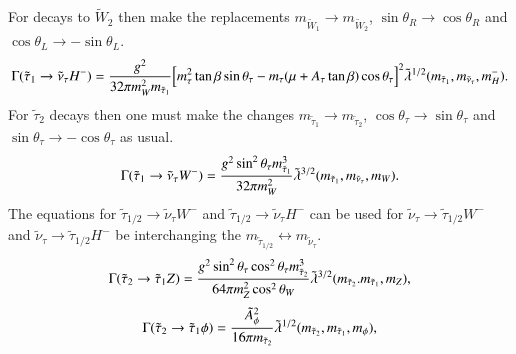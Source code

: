 \documentclass[final,3p,times,pdflatex]{elsarticle}
\begin{document}
For decays to $\tilde{W}_2$ then make the replacements $m_{\tilde{W}_1} \rightarrow m_{\tilde{W}_2}$, $\sin\theta_R \rightarrow \cos\theta_R$ and $\cos\theta_L \rightarrow -\sin\theta_L$.
\begin{equation}\label{stau1nutauHpm}
\begin{aligned}
\Gamma (\tilde{\tau}_1 \rightarrow \tilde{\nu}_\tau H^-) = {g^2 \over 32\pi m_W^2 m_{\tilde{\tau}_1}} \Big[m_\tau^2 \tan\beta\sin\theta_{\tau} - m_\tau (\mu + A_\tau \tan\beta) \cos\theta_{\tau}\Big]^2 \tilde{\lambda}^{1/2} (m_{\tilde{\tau}_1}, m_{\tilde{\nu}_\tau}, m_H^-).
\end{aligned}
\end{equation} 
For $\tilde{\tau}_2$ decays then one must make the changes $m_{\tilde{\tau}_1} \rightarrow m_{\tilde{\tau}_2}$, $\cos\theta_\tau \rightarrow \sin\theta_\tau$ and $\sin\theta_\tau \rightarrow -\cos\theta_\tau$ as usual.
\begin{equation}\label{stau1nutauW}
\begin{aligned}
\Gamma (\tilde{\tau}_1 \rightarrow \tilde{\nu}_\tau W^-) = {g^2 \sin^2\theta_\tau m_{\tilde{\tau}_1}^3 \over 32\pi m_W^2 } \tilde{\lambda}^{3/2} (m_{\tilde{\tau}_1}, m_{\tilde{\nu}_\tau}, m_W).
\end{aligned}
\end{equation} 
The equations for $\tilde{\tau}_{1/2} \rightarrow \tilde{\nu}_\tau W^-$ and $\tilde{\tau}_{1/2} \rightarrow \tilde{\nu}_\tau H^-$ can be used for $\tilde{\nu}_{\tau} \rightarrow \tilde{\tau}_{1/2} W^-$ and $\tilde{\nu}_{\tau} \rightarrow \tilde{\tau}_{1/2} H^-$ be interchanging the $m_{\tilde{\tau}_{1/2}} \leftrightarrow m_{\tilde{\nu}_{\tau}}$.
\begin{equation}\label{stau2stau1Z}
\begin{aligned}
\Gamma (\tilde{\tau}_2 \rightarrow \tilde{\tau}_1 Z) = {g^2 \sin^2\theta_{\tau} \cos^2 \theta_{\tau} m_{\tilde{\tau}_2}^3 \over 64\pi m_Z^2 \cos^2 \theta_W } \tilde{\lambda}^{3/2} (m_{\tilde{\tau}_2}. m_{\tilde{\tau}_1}, m_Z) ,
\end{aligned}
\end{equation} 
\begin{equation}\label{stau2stau1phi}
\begin{aligned}
\Gamma (\tilde{\tau}_2 \rightarrow \tilde{\tau}_1 \phi) = {{\tilde{A}_{\phi}}^2 \over 16 \pi m_{\tilde{\tau}_2} } \tilde{\lambda}^{1/2} (m_{\tilde{\tau}_2}, m_{\tilde{\tau}_1}, m_{\phi}) ,
\end{aligned}
\end{equation} 
\end{document}
